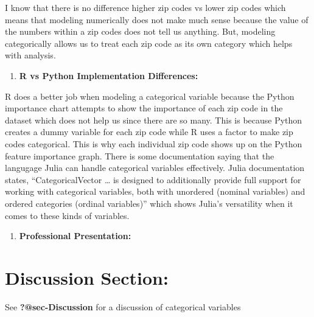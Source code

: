 \documentclass[
  letterpaper,
  DIV=11,
  numbers=noendperiod]{scrartcl}
\providecommand{\tightlist}{%
  \setlength{\itemsep}{0pt}\setlength{\parskip}{0pt}}
\begin{document}
I know that there is no difference higher zip codes vs lower zip codes
which means that modeling numerically does not make much sense because
the value of the numbers within a zip codes does not tell us anything.
But, modeling categorically allows us to treat each zip code as its own
category which helps with analysis.

\begin{enumerate}
\def\labelenumi{\arabic{enumi}.}
\setcounter{enumi}{1}
\tightlist
\item
  \textbf{R vs Python Implementation Differences:}
\end{enumerate}

R does a better job when modeling a categorical variable because the
Python importance chart attempts to show the importance of each zip code
in the dataset which does not help us since there are so many. This is
because Python creates a dummy variable for each zip code while R uses a
factor to make zip codes categorical. This is why each individual zip
code shows up on the Python feature importance graph. There is some
documentation saying that the langugage Julia can handle categorical
variables effectively. Julia documentation states, ``CategoricalVector
\ldots{} is designed to additionally provide full support for working
with categorical variables, both with unordered (nominal variables) and
ordered categories (ordinal variables)'' which shows Julia's versatility
when it comes to these kinds of variables.

\begin{enumerate}
\def\labelenumi{\arabic{enumi}.}
\setcounter{enumi}{2}
\tightlist
\item
  \textbf{Professional Presentation:}
\end{enumerate}

\section{Discussion Section:}\label{discussion-section}

See \textbf{?@sec-Discussion} for a discussion of categorical variables
\end{document}
